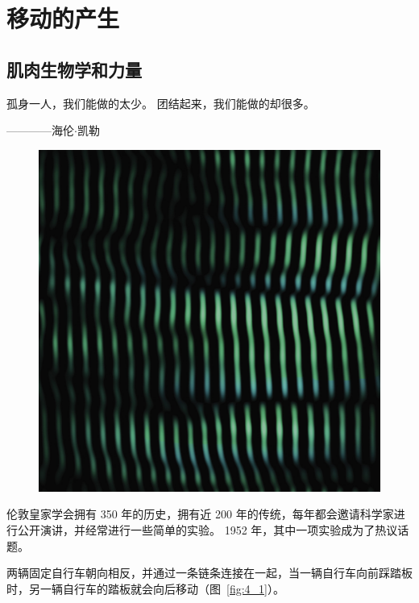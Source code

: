 \part{移动的产生}

\chapter{肌肉生物学和力量}\label{chap:chap4}


孤身一人，我们能做的太少。
团结起来，我们能做的却很多。
\begin{flushright}
	————海伦$\cdot$凯勒
\end{flushright}


\begin{figure}[!htb]
	\centering
	\includegraphics[width=1.0\linewidth]{chap4/4_0}
	\caption*{ \label{fig:4_0}}
\end{figure}


伦敦皇家学会拥有 350 年的历史，拥有近 200 年的传统，每年都会邀请科学家进行公开演讲，并经常进行一些简单的实验。
1952 年，其中一项实验成为了热议话题。


两辆固定自行车朝向相反，并通过一条链条连接在一起，当一辆自行车向前踩踏板时，另一辆自行车的踏板就会向后移动（图~\ref{fig:4_1}）。


